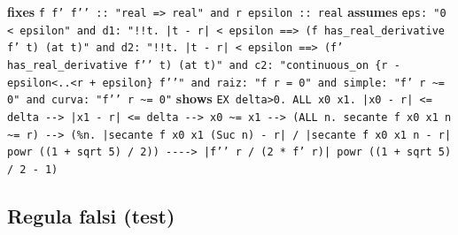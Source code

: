 \documentclass[11pt,a4paper]{article}
\begin{document}
\begin{itemize}
  {\footnotesize \textbf{fixes} \texttt{f f' f'{}' :\allowbreak{}:\allowbreak{} "real =\allowbreak{}> real" and r epsilon :\allowbreak{}:\allowbreak{} real} \textbf{assumes} \texttt{eps:\allowbreak{} "0 < epsilon" and d1:\allowbreak{} "!{}!t. |\allowbreak{}t -\allowbreak{} r|\allowbreak{} < epsilon =\allowbreak{}=\allowbreak{}> (\allowbreak{}f has\_\allowbreak{}real\_\allowbreak{}derivative f' t) (\allowbreak{}at t)" and d2:\allowbreak{} "!{}!t. |\allowbreak{}t -\allowbreak{} r|\allowbreak{} < epsilon =\allowbreak{}=\allowbreak{}> (\allowbreak{}f' has\_\allowbreak{}real\_\allowbreak{}derivative f'{}' t) (\allowbreak{}at t)" and c2:\allowbreak{} "continuous\_\allowbreak{}on \{r -\allowbreak{} epsilon<..<r +\allowbreak{} epsilon\} f'{}'" and raiz:\allowbreak{} "f r =\allowbreak{} 0" and simple:\allowbreak{} "f' r \textasciitilde{}=\allowbreak{} 0" and curva:\allowbreak{} "f'{}' r \textasciitilde{}=\allowbreak{} 0"} \textbf{shows} \texttt{EX delta>0. ALL x0 x1. |\allowbreak{}x0 -\allowbreak{} r|\allowbreak{} <=\allowbreak{} delta -\allowbreak{}{}-\allowbreak{}{}> |\allowbreak{}x1 -\allowbreak{} r|\allowbreak{} <=\allowbreak{} delta -\allowbreak{}{}-\allowbreak{}{}> x0 \textasciitilde{}=\allowbreak{} x1 -\allowbreak{}{}-\allowbreak{}{}> (\allowbreak{}ALL n. secante f x0 x1 n \textasciitilde{}=\allowbreak{} r) -\allowbreak{}{}-\allowbreak{}{}> (\allowbreak{}\%n. |\allowbreak{}secante f x0 x1 (\allowbreak{}Suc n) -\allowbreak{} r|\allowbreak{} /\allowbreak{} |\allowbreak{}secante f x0 x1 n -\allowbreak{} r|\allowbreak{} powr (\allowbreak{}(\allowbreak{}1 +\allowbreak{} sqrt 5) /\allowbreak{} 2)) -\allowbreak{}{}-\allowbreak{}{}-\allowbreak{}{}-\allowbreak{}{}> |\allowbreak{}f'{}' r /\allowbreak{} (\allowbreak{}2 *\allowbreak{} f' r)|\allowbreak{} powr (\allowbreak{}(\allowbreak{}1 +\allowbreak{} sqrt 5) /\allowbreak{} 2 -\allowbreak{} 1)}\par}
\end{itemize}

\subsection{Regula falsi (test)}
\end{document}
